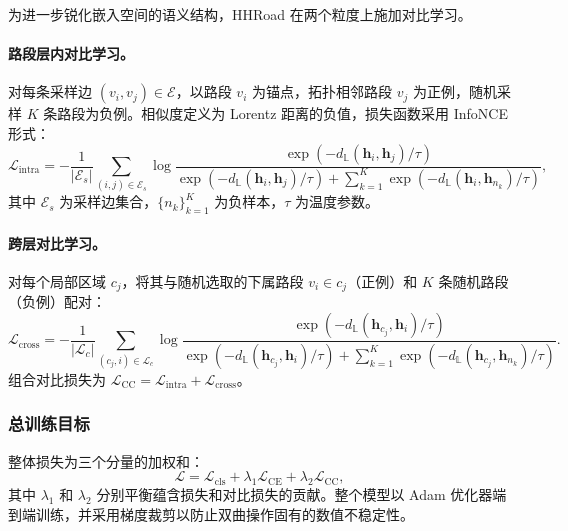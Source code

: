 为进一步锐化嵌入空间的语义结构，HHRoad 在两个粒度上施加对比学习。

\paragraph{路段层内对比学习。} 对每条采样边 $(v_i, v_j) \in \mathcal{E}$，以路段 $v_i$ 为锚点，拓扑相邻路段 $v_j$ 为正例，随机采样 $K$ 条路段为负例。相似度定义为 Lorentz 距离的负值，损失函数采用 InfoNCE 形式：
\begin{equation}
    \mathcal{L}_{\text{intra}} = -\frac{1}{|\mathcal{E}_s|}
    \sum_{(i,j) \in \mathcal{E}_s}
    \log \frac{
      \exp\!\left(-d_{\mathbb{L}}(\mathbf{h}_i, \mathbf{h}_j) / \tau\right)
    }{
      \exp\!\left(-d_{\mathbb{L}}(\mathbf{h}_i, \mathbf{h}_j) / \tau\right)
      + \sum_{k=1}^{K} \exp\!\left(-d_{\mathbb{L}}(\mathbf{h}_i, \mathbf{h}_{n_k}) / \tau\right)
    },
    \label{eq:loss_seg_cl}
\end{equation}
其中 $\mathcal{E}_s$ 为采样边集合，$\{n_k\}_{k=1}^K$ 为负样本，$\tau$ 为温度参数。

\paragraph{跨层对比学习。} 对每个局部区域 $c_j$，将其与随机选取的下属路段 $v_i \in c_j$（正例）和 $K$ 条随机路段（负例）配对：
\begin{equation}
    \mathcal{L}_{\text{cross}} = -\frac{1}{|\mathcal{L}_c|}
    \sum_{(c_j, i) \in \mathcal{L}_c}
    \log \frac{
      \exp\!\left(-d_{\mathbb{L}}(\mathbf{h}_{c_j}, \mathbf{h}_i) / \tau\right)
    }{
      \exp\!\left(-d_{\mathbb{L}}(\mathbf{h}_{c_j}, \mathbf{h}_i) / \tau\right)
      + \sum_{k=1}^{K} \exp\!\left(-d_{\mathbb{L}}(\mathbf{h}_{c_j}, \mathbf{h}_{n_k}) / \tau\right)
    }.
    \label{eq:loss_cross_cl}
\end{equation}
组合对比损失为 $\mathcal{L}_{\text{CC}} = \mathcal{L}_{\text{intra}} + \mathcal{L}_{\text{cross}}$。

\subsubsection{总训练目标}

整体损失为三个分量的加权和：
\begin{equation}
    \mathcal{L} = \mathcal{L}_{\text{cls}}
    + \lambda_1 \mathcal{L}_{\text{CE}}
    + \lambda_2 \mathcal{L}_{\text{CC}},
    \label{eq:total_loss}
\end{equation}
其中 $\lambda_1$ 和 $\lambda_2$ 分别平衡蕴含损失和对比损失的贡献。整个模型以 Adam 优化器端到端训练，并采用梯度裁剪以防止双曲操作固有的数值不稳定性。

